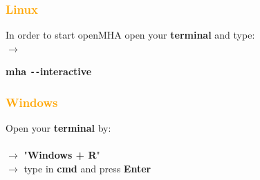 \documentclass[11pt,a4paper,twoside]{article}
\newcommand{\+}{\discretionary{\mbox{\scriptsize$\hookleftarrow$}}{}{}}
\begin{document}
\subsubsection*{\textcolor{orange}{\textbf{Linux}}}

In order to start openMHA open your \textbf{terminal} and type: \\
$\rightarrow$ {{\ttfamily \textbf{mha \texttt{-{}-}interactive}} 


\subsubsection*{\textcolor{orange}{Windows}}}
Open your \textbf{terminal} by: \\ \\
$\rightarrow$ "\textbf{Windows + R}" \\
    $\rightarrow$ type in {{\ttfamily \textbf{cmd}}} and press \textbf{Enter} \\
\end{document}
